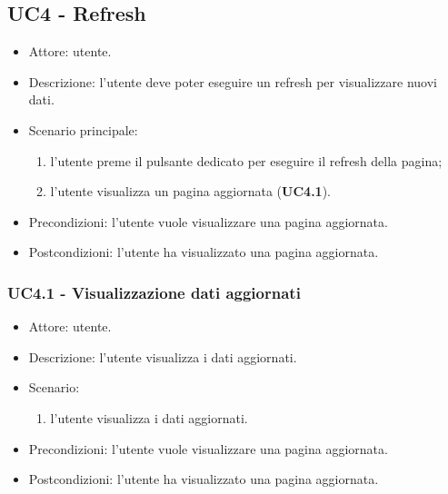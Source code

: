     \subsection{UC4 - Refresh}
    \begin{itemize}
        \item Attore: utente.
        \item Descrizione: l'utente deve poter eseguire un refresh per visualizzare nuovi dati.
        \item Scenario principale:
            \begin{enumerate}
            \item l'utente preme il pulsante dedicato per eseguire il refresh della pagina;
            \item l'utente visualizza un pagina aggiornata (\textbf{UC4.1}).
            \end{enumerate}
        \item Precondizioni: l'utente vuole visualizzare una pagina aggiornata.
        \item Postcondizioni: l'utente ha visualizzato una pagina aggiornata.
    \end{itemize}

    \subsubsection{UC4.1 - Visualizzazione dati aggiornati}
    \begin{itemize}
        \item Attore: utente.
        \item Descrizione: l'utente visualizza i dati aggiornati.
        \item Scenario:
        \begin{enumerate}
        \item l'utente visualizza i dati aggiornati.
        \end{enumerate}
        \item Precondizioni: l'utente vuole visualizzare una pagina aggiornata.
        \item Postcondizioni: l'utente ha visualizzato una pagina aggiornata.
    \end{itemize}

